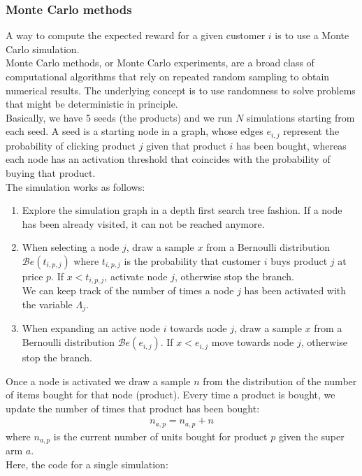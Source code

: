 \subsubsection{Monte Carlo methods}
A way to compute the expected reward for a given customer $i$ is to use a Monte Carlo simulation.\\ Monte Carlo methods, or Monte Carlo experiments, are a broad class of computational algorithms that rely on repeated random sampling to obtain numerical results. The underlying concept is to use randomness to solve problems that might be deterministic in principle.\\ Basically, we have 5 seeds (the products) and we run $N$ simulations starting from each seed.
A seed is a starting node in a graph, whose edges $e_{i, j}$ represent the probability of clicking product $j$ given that product $i$ has been bought, whereas each node has an activation threshold that coincides with the probability of buying that product.\\
The simulation works as follows:
\begin{enumerate}
    \item Explore the simulation graph in a depth first search tree fashion. If a node has been already visited, it can not be reached anymore.
    \item When selecting a node $j$, draw a sample $x$ from a Bernoulli distribution  $\mathcal{B}e(t_{i, p, j})$ where $t_{i, p, j}$ is the probability that customer $i$ buys product $j$ at price $p$. If $x < t_{i, p, j}$, activate node $j$, otherwise stop the branch.\\ We can keep track of the number of times a node $j$ has been activated with the variable $\Lambda_j$.
    \item When expanding an active node $i$ towards node $j$, draw a sample $x$ from a Bernoulli distribution $\mathcal{B}e(e_{i, j})$. If $x < e_{i, j}$ move towards node $j$, otherwise stop the branch.
\end{enumerate}
Once a node is activated we draw a sample $n$ from the distribution of the number of items bought for that node (product). Every time a product is bought, we update the number of times that product has been bought:
\begin{align*}
    n_{a, p} = n_{a, p} + n
\end{align*}
where $n_{a, p}$ is the current number of units bought for product $p$ given the super arm $a$.\\
Here, the code for a single simulation:\\
